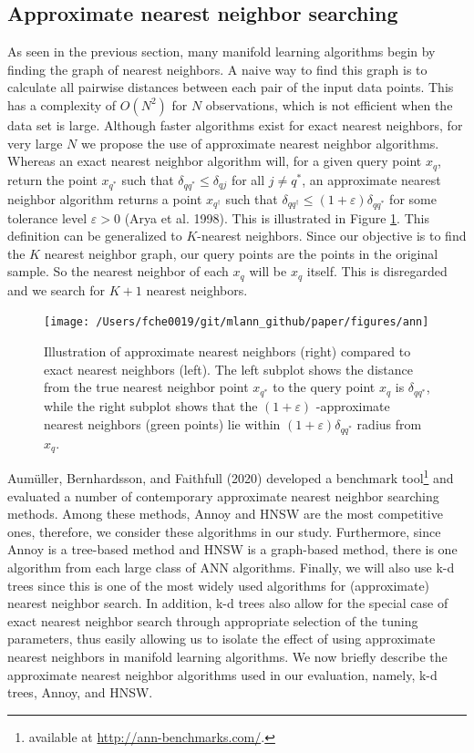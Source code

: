 \documentclass[12pt]{article}
\begin{document}
\hypertarget{ann}{%
\subsection{Approximate nearest neighbor searching}\label{ann}}

As seen in the previous section, many manifold learning algorithms begin by finding the graph of nearest neighbors. A naive way to find this graph is to calculate all pairwise distances between each pair of the input data points. This has a complexity of \(O(N^2)\) for \(N\) observations, which is not efficient when the data set is large. Although faster algorithms exist for exact nearest neighbors, for very large \(N\) we propose the use of approximate nearest neighbor algorithms. Whereas an exact nearest neighbor algorithm will, for a given query point \(x_q\), return the point \(x_{q^*}\) such that \(\delta_{q{q^*}} \leq \delta_{qj}\) for all \(j\neq q^*\), an approximate nearest neighbor algorithm returns a point \(x_{q^\dagger}\) such that \(\delta_{q{q^\dagger}} \leq (1+\varepsilon) \delta_{q{q^*}}\) for some tolerance level \(\varepsilon > 0\) (Arya et al. 1998). This is illustrated in Figure \ref{fig:ann}. This definition can be generalized to \(K\)-nearest neighbors. Since our objective is to find the \(K\) nearest neighbor graph, our query points are the points in the original sample. So the nearest neighbor of each \(x_q\) will be \(x_q\) itself. This is disregarded and we search for \(K+1\) nearest neighbors.

\begin{figure}

{\centering \texttt{[image: /Users/fche0019/git/mlann\_github/paper/figures/ann]} 

}

\caption{Illustration of approximate nearest neighbors (right) compared to exact nearest neighbors (left). The left subplot shows the distance from the true nearest neighbor point $x_{q^*}$ to the query point $x_q$ is $\delta_{q{q^*}}$, while the right subplot shows that the $(1+\varepsilon)$ -approximate nearest neighbors (green points) lie within $(1+\varepsilon) \delta_{q{q^*}}$ radius from $x_q$. }\label{fig:ann}
\end{figure}

Aumüller, Bernhardsson, and Faithfull (2020) developed a benchmark tool\footnote{available at \url{http://ann-benchmarks.com/}.} and evaluated a number of contemporary approximate nearest neighbor searching methods. Among these methods, Annoy and HNSW are the most competitive ones, therefore, we consider these algorithms in our study. Furthermore, since Annoy is a tree-based method and HNSW is a graph-based method, there is one algorithm from each large class of ANN algorithms. Finally, we will also use k-d trees since this is one of the most widely used algorithms for (approximate) nearest neighbor search. In addition, k-d trees also allow for the special case of exact nearest neighbor search through appropriate selection of the tuning parameters, thus easily allowing us to isolate the effect of using approximate nearest neighbors in manifold learning algorithms. We now briefly describe the approximate nearest neighbor algorithms used in our evaluation, namely, k-d trees, Annoy, and HNSW.
\end{document}
